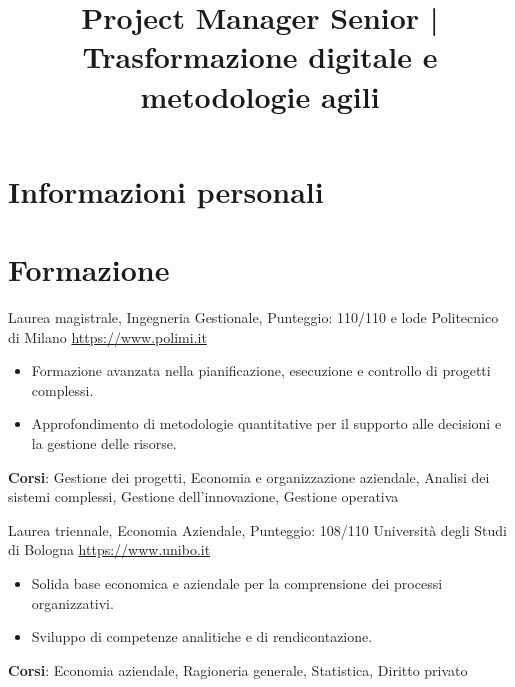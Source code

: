 \documentclass[a4paper, serif, 10pt]{moderncv}
\title{Project Manager Senior | Trasformazione digitale e metodologie agili}
\begin{document}
\maketitle

\section{Informazioni personali}

\section{Formazione}

        {Laurea magistrale, Ingegneria Gestionale, Punteggio: 110/110 e lode}
        {Politecnico di Milano}
        {\url{https://www.polimi.it}}
        {}
        {\begin{itemize}
\item Formazione avanzata nella pianificazione, esecuzione e controllo di progetti complessi.
\item Approfondimento di metodologie quantitative per il supporto alle decisioni e la gestione delle risorse.
\end{itemize}
\textbf{Corsi}: Gestione dei progetti, Economia e organizzazione aziendale, Analisi dei sistemi complessi, Gestione dell'innovazione, Gestione operativa}

        {Laurea triennale, Economia Aziendale, Punteggio: 108/110}
        {Università degli Studi di Bologna}
        {\url{https://www.unibo.it}}
        {}
        {\begin{itemize}
\item Solida base economica e aziendale per la comprensione dei processi organizzativi.
\item Sviluppo di competenze analitiche e di rendicontazione.
\end{itemize}
\textbf{Corsi}: Economia aziendale, Ragioneria generale, Statistica, Diritto privato}
\end{document}
